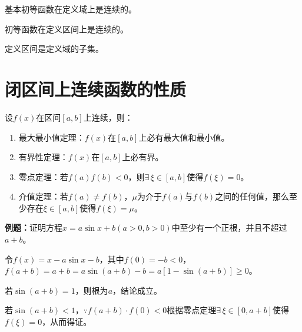 \documentclass[UTF8, 12pt]{ctexart}
\begin{document}
    基本初等函数在定义域上是连续的。

    初等函数在定义区间上是连续的。

    定义区间是定义域的子集。


    \section{闭区间上连续函数的性质}

    设$f(x)$在区间$[a,b]$上连续，则：

    \begin{enumerate}
        \item 最大最小值定理：$f(x)$在$[a,b]$上必有最大值和最小值。
        \item 有界性定理：$f(x)$在$[a,b]$上必有界。
        \item 零点定理：若$f(a)f(b)<0$，则$\exists\,\xi\in[a,b]$使得$f(\xi)=0$。
        \item 介值定理：若$f(a)\neq f(b)$，$\mu$为介于$f(a)$与$f(b)$之间的任何值，那么至少存在$\xi\in[a,b]$使得$f(\xi)=\mu$。
    \end{enumerate}

    \textbf{例题：}证明方程$x=a\sin x+b(a>0,b>0)$中至少有一个正根，并且不超过$a+b$。

    令$f(x)=x-a\sin x-b$，其中$f(0)=-b<0$，$f(a+b)=a+b=a\sin(a+b)-b=a[1-\sin(a+b)]\geqslant 0$。

    若$\sin(a+b)=1$，则根为$a$，结论成立。

    若$\sin(a+b)<1$，$\because f(a+b)\cdot f(0)<0$根据零点定理$\exists\,\xi\in[0,a+b]$使得$f(\xi)=0$，从而得证。
\end{document}
